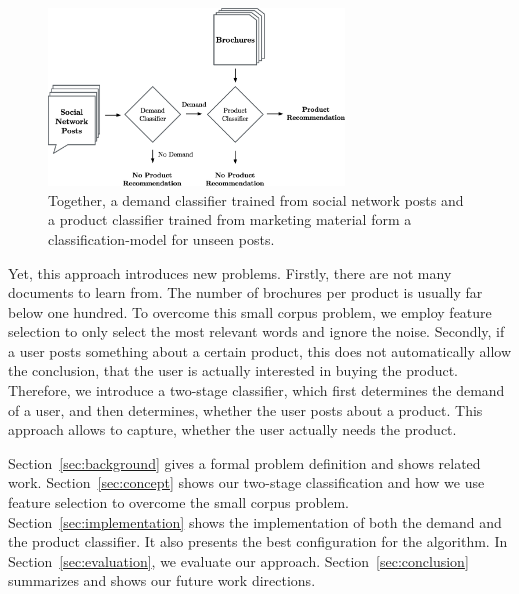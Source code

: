 \begin{figure}
	\begin{center}
		\includegraphics[width=0.7\textwidth]{figures/nto_workflow.eps}
	\end{center}
	\caption{Together, a demand classifier trained from social network posts and a product classifier trained from marketing material form a classification-model for unseen posts.}
	\label{fig:figureone}
\end{figure}

Yet, this approach introduces new problems.
Firstly, there are not many documents to learn from.
The number of brochures per product is usually far below one hundred.
To overcome this small corpus problem, we employ feature selection to only select the most relevant words and ignore the noise.
Secondly, if a user posts something about a certain product, this does not automatically allow the conclusion, that the user is actually interested in buying the product.
Therefore, we introduce a two-stage classifier, which first determines the demand of a user, and then determines, whether the user posts about a product.
This approach allows to capture, whether the user actually needs the product.

Section~\ref{sec:background} gives a formal problem definition and shows related work.
Section~\ref{sec:concept} shows our two-stage classification and how we use feature selection to overcome the small corpus problem.
Section~\ref{sec:implementation} shows the implementation of both the demand and the product classifier.
It also presents the best configuration for the algorithm.
In Section~\ref{sec:evaluation}, we evaluate our approach.
Section~\ref{sec:conclusion} summarizes and shows our future work directions.
